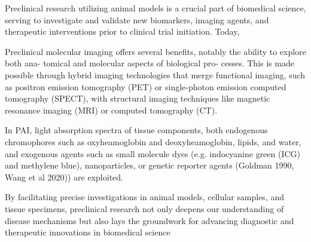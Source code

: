 Preclinical research utilizing animal models is a crucial part of biomedical science, serving to investigate and validate new biomarkers, imaging agents, and therapeutic interventions prior to clinical trial initiation. Today,


Preclinical molecular imaging offers several
benefits, notably the ability to explore both ana- tomical and molecular aspects of biological pro- cesses. This is made possible through hybrid imaging
technologies that merge functional imaging, such as positron emission tomography (PET)
or single-photon emission computed
tomography (SPECT), with structural imaging techniques
like magnetic resonance imaging
(MRI) or computed tomography (CT).


In PAI, light absorption spectra of tissue components, both endogenous chromophores such as
oxyheamoglobin and deoxyheamoglobin, lipids, and water, and exogenous agents such as small molecule dyes (e.g. indocyanine green (ICG) and methylene blue), nanoparticles, or genetic reporter agents (Goldman 1990, Wang et al 2020)) are exploited.

By facilitating precise investigations in animal models, cellular samples, and tissue specimens, preclinical research not only deepens our understanding of disease mechanisms but also lays the groundwork for advancing diagnostic and therapeutic innovations in biomedical science